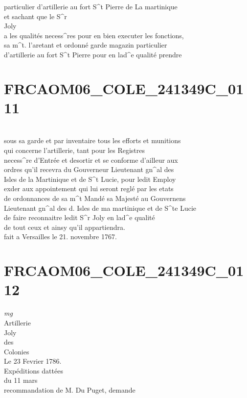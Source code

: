 \documentclass{article}
\begin{document}
\begin{pages}
particulier d'artillerie au fort S\^{}t Pierre de La martinique\\
et sachant que le S\^{}r\\
Joly\\
a les qualités necess\^{}res pour en bien executer les fonctions,\\
sa m\^{}t. l'aretant et ordonné garde magazin particulier\\
d'artillerie au fort S\^{}t Pierre pour en lad\^{}e qualité prendre
\pend
\endnumbering\beginnumbering\section{FRCAOM06\_COLE\_241349C\_0111}\pstart
\\
sous sa garde et par inventaire tous les efforts et munitions\\
qui concerne l'artillerie, tant pour les Registres\\
necess\^{}re d'Entrée et desortir et se conforme d'ailleur aux\\
ordres qu'il recevra du Gouverneur Lieutenant gn\^{}al des\\
Isles de la Martinique et de S\^{}t Lucie, pour ledit Employ\\
exder aux appointement qui lui seront reglé par les etats\\
de ordonnances de sa m\^{}t Mandé sa Majesté au Gouvernens\\
Lieutenant gn\^{}al des d. Isles de ma martinique et de S\^{}te Lucie\\
de faire reconnaitre ledit S\^{}r Joly en lad\^{}e qualité\\
de tout ceux et ainsy qu'il appartiendra.\\
fait a Versailles le 21. novembre 1767.
\pend
\endnumbering\beginnumbering\section{FRCAOM06\_COLE\_241349C\_0112}
\vspace{0.5cm}\noindent
\textit{mg}
\footnotesize \\
Artillerie\\
Joly\\
des\\
Colonies\\
Le 23 Fevrier 1786.\\
Expéditions dattées\\
du 11 mars
\normalsize \pstart
\\
recommandation de M. Du Puget, demande\\

\end{pages}
\end{document}
